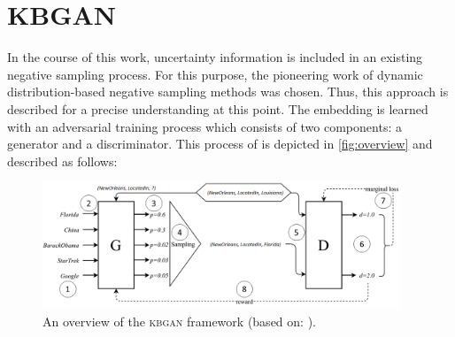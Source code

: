 \section{KBGAN} 
\label{sec:kbgan}
%
In the course of this work, uncertainty information is included in an existing negative sampling process.
For this purpose, the pioneering work of dynamic distribution-based negative sampling methods \kbgan was chosen.
Thus, this approach is described for a precise understanding at this point.
The embedding is learned with an adversarial training process which consists of two components: a generator and a discriminator.
This process of \kbgan is depicted in \autoref{fig:overview} and described as follows:
\begin{figure}[t]
  \centering
    \includegraphics[width=0.95\textwidth]{figures/kbgan_original.png}
  \caption{An overview of the \textsc{kbgan} framework (based on: \cite{cai2017kbgan}).}
  \label{fig:overview}
\end{figure}

